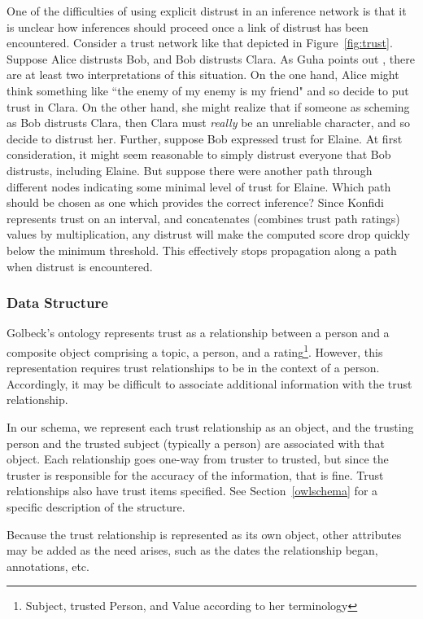\documentclass[letterpaper]{www2006-submission}
\begin{document}
One of the difficulties of using explicit distrust in an inference network is that it is unclear how inferences should proceed once a link of distrust has been encountered.  Consider a trust network like that depicted in Figure~\ref{fig:trust}.  Suppose Alice distrusts Bob, and Bob distrusts Clara.  As Guha points out \citep{guha04propagation}, there are at least two interpretations of this situation.  On the one hand, Alice might think something like ``the enemy of my enemy is my friend" and so decide to put trust in Clara.  On the other hand, she might realize that if someone as scheming as Bob distrusts Clara, then Clara must \textit{really} be an unreliable character, and so decide to distrust her.  Further, suppose Bob expressed trust for Elaine.  At first consideration, it might seem reasonable to simply distrust everyone that Bob distrusts, including Elaine.  But suppose there were another path through different nodes indicating some minimal level of trust for Elaine.  Which path should be chosen as one which provides the correct inference?  Since Konfidi represents trust on an interval, and concatenates (combines trust path ratings) values by multiplication, any distrust will make the computed score drop quickly below the minimum threshold.  This effectively stops propagation along a path when distrust is encountered.

\subsubsection{Data Structure}
\label{rating}
Golbeck's ontology represents trust as a relationship between a person and a composite object comprising a topic, a person, and a rating\footnote{Subject, trusted Person, and Value according to her terminology}.  However, this representation requires trust relationships to be in the context of a person.  Accordingly, it may be difficult to associate additional information with the trust relationship.  

In our schema, we represent each trust relationship as an object, and the trusting person and the trusted subject (typically a person) are associated with that object.  Each relationship goes one-way from truster to trusted, but since the truster is responsible for the accuracy of the information, that is fine.  Trust relationships also have trust items specified.  See Section~\ref{owlschema} for a specific description of the structure.

Because the trust relationship is represented as its own object, other attributes may be added as the need arises, such as the dates the relationship began, annotations, etc. 
\end{document}
